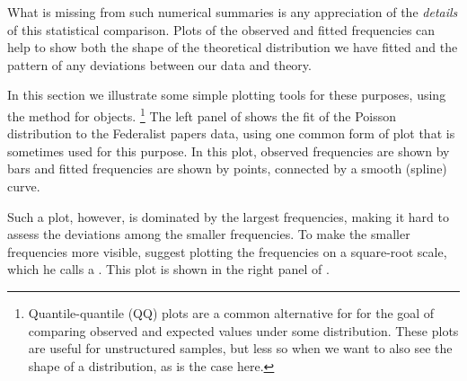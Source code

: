 \documentclass[10pt,krantz2]{krantz}\usepackage[]{graphicx}\usepackage[]{color}
\begin{document}
What is missing from such numerical summaries is any appreciation
of the \emph{details} of this statistical comparison.
Plots of the observed and fitted frequencies can help to show
both the shape of the theoretical distribution we have fitted and the
pattern of any deviations between our data and theory.

In this section we illustrate some simple plotting tools for
these purposes, using the  method for
 objects.%
\footnote{
Quantile-quantile (QQ) plots are a common alternative for
for the goal of comparing observed and expected values
under some distribution.  These plots are useful for
unstructured samples, but less so when we want to also
see the shape of a distribution, as is the case here.
}
The left panel of
 shows the fit of the Poisson distribution to the Federalist papers data, using one common form of plot that is sometimes
used for this purpose.
In this plot, observed frequencies are shown by bars and fitted
frequencies are shown by points, connected by a smooth (spline)
curve.

Such a plot, however, is dominated by the largest frequencies,
making it hard to assess the deviations among the smaller frequencies.
To make the smaller frequencies more visible, \citet{Tukey:77}
suggest plotting the frequencies  on a square-root scale,
which he calls a . This plot is shown in the right
panel of .
\end{document}
